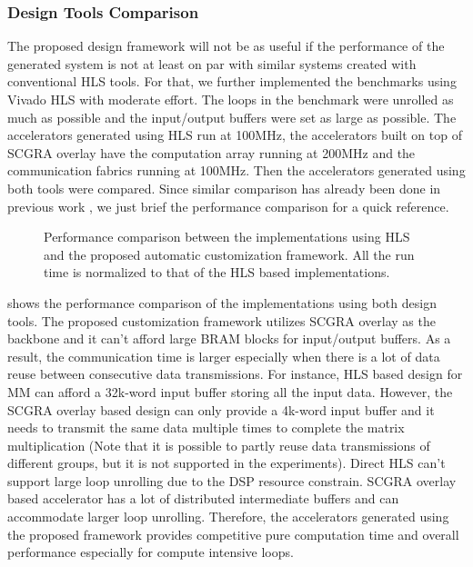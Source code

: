 \subsubsection{Design Tools Comparison}
The proposed design framework will not be as useful if the performance of the 
generated system is not at least on par with similar systems created with 
conventional HLS tools. For that, we further implemented the 
benchmarks using Vivado HLS with moderate effort. The loops in the benchmark 
were unrolled as much as possible and the input/output buffers were set as large 
as possible. The accelerators generated using HLS run at 100MHz, the accelerators 
built on top of SCGRA overlay have the computation array running at 200MHz 
and the communication fabrics running at 100MHz. Then the accelerators 
generated using both tools were compared. 
Since similar comparison has already been done in previous work \cite{scgra}, 
we just brief the performance comparison for a quick reference.

\begin{figure}[tb]
    \centering
    \hfill
    \caption{Performance comparison between the implementations 
        using HLS and the proposed automatic customization framework.
    All the run time is normalized to that of the HLS based implementations.}
	\label{fig:hls-cp}
\end{figure}


 shows the performance comparison of the implementations using 
both design tools. The proposed customization framework utilizes 
SCGRA overlay as the backbone and it can't afford large 
BRAM blocks for input/output buffers. As a result, the communication time is larger 
especially when there is a lot of data reuse between consecutive data transmissions.
For instance, HLS based design for MM can afford a 32k-word input buffer storing all 
the input data. However, the SCGRA overlay based design can only 
provide a 4k-word input buffer and it needs to transmit the same data 
multiple times to complete the matrix multiplication (Note that it is 
possible to partly reuse data transmissions of different groups, but it is 
not supported in the experiments). Direct HLS can't support large 
loop unrolling due to the DSP resource constrain. SCGRA overlay based accelerator 
has a lot of distributed intermediate buffers and can accommodate larger loop unrolling.
Therefore, the accelerators generated using the proposed framework provides competitive 
pure computation time and overall performance especially for compute intensive loops.


